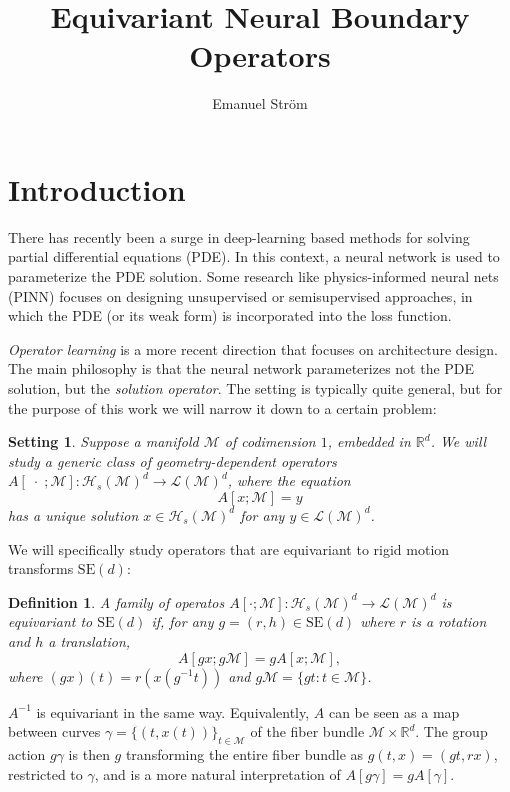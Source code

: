 \documentclass{article}
\title{Equivariant Neural Boundary Operators}
\author{Emanuel Ström}
\date{}
\newtheorem{note}{Setting}
\newtheorem{definition}{Definition}
\newcommand{\manifold}{\mathcal{M}}
\newcommand{\Rn}[1]{\mathbb{R}^{#1}}
\newcommand{\Ltwo}{\mathcal{L}}
\newcommand{\sobolev}{\mathcal{H}}
\newcommand{\dif}[1]{\mathrm{d}#1}
\newcommand{\fhtwo}{\mathrm{FH2}}
\newcommand{\euclid}[1]{\mathrm{SE}(#1)}
\newcommand{\GL}[1]{\mathrm{GL}(\Rn{#1})}
\begin{document}
    \maketitle


    \section{Introduction}
    There has recently been a surge in deep-learning based methods for solving partial differential equations (PDE). In this context, a neural network is used to parameterize the PDE solution. Some research like physics-informed neural nets (PINN) focuses on designing unsupervised or semisupervised approaches, in which the PDE (or its weak form) is incorporated into the loss function. 
    
    \emph{Operator learning} is a more recent direction that focuses on architecture design. The main philosophy is that the neural network parameterizes not the PDE solution, but the \emph{solution operator}. The setting is typically quite general, but for the purpose of this work we will narrow it down to a certain problem:
    \begin{note}
        Suppose a manifold $\manifold$ of codimension $1$, embedded in $\Rn{d}$. We will study a generic class of geometry-dependent operators $A[\;\cdot\; ;\manifold]\colon \sobolev_s(\manifold)^d\to\Ltwo(\manifold)^d$, where the equation
        \[
            A[x;\manifold] = y
        \]    
        has a unique solution $x\in \sobolev_s(\manifold)^d$ for any $y\in \Ltwo(\manifold)^d$. 
    \end{note}
    We will specifically study operators that are equivariant to rigid motion transforms $\euclid{d}$:
    \begin{definition}
        A family of operatos $A[\cdot; \manifold]\colon\sobolev_s(\manifold)^d\to\Ltwo(\manifold)^d$ is equivariant to $\euclid{d}$ if, for any $g=(r,h)\in \euclid{d}$ where $r$ is a rotation and $h$ a translation, 
        \[  
            A[gx; g\manifold] = gA[x; \manifold],
        \]
        where $(gx)(t) = r(x(g^{-1}t))$ and $g\manifold=\{gt\colon t\in \manifold\}$.
    \end{definition} 
    $A^{-1}$ is equivariant in the same way. Equivalently, $A$ can be seen as a map between curves $\gamma = \{(t,x(t))\}_{t\in\manifold}$ of the fiber bundle $\manifold\times \Rn{d}$. The group action $g\gamma$ is then $g$ transforming the entire fiber bundle as $g(t,x) = (gt, rx)$, restricted to $\gamma$, and is a more natural interpretation of $A[g\gamma]=gA[\gamma]$.
\end{document}
